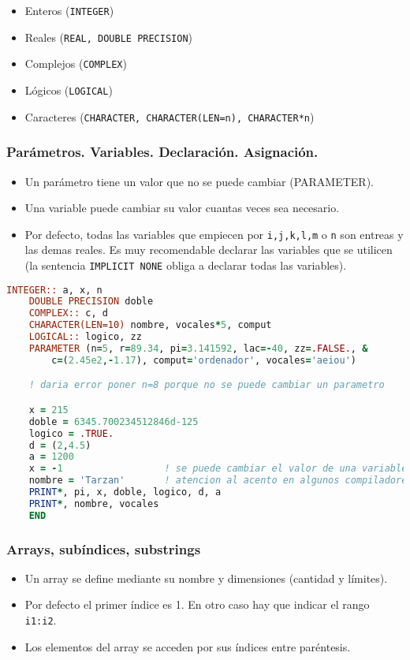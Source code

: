 \begin{itemize}
	\item Enteros ({\tt INTEGER})
	\item Reales ({\tt REAL, DOUBLE PRECISION})
	\item Complejos ({\tt COMPLEX})
	\item Lógicos ({\tt LOGICAL})
	\item Caracteres ({\tt CHARACTER, CHARACTER(LEN=n), CHARACTER*n})
\end{itemize}

\subsubsection{Parámetros. Variables. Declaración. Asignación.}

\begin{itemize}
	\item Un parámetro tiene un valor que no se puede cambiar (PARAMETER).
	\item Una variable puede cambiar su valor cuantas veces sea necesario.
	\item Por defecto, todas las variables que empiecen por \texttt{i,j,k,l,m} o \texttt{n} son entreas y las demas reales. Es muy recomendable declarar las variables que se utilicen (la sentencia {\tt IMPLICIT NONE} obliga a declarar todas las variables).
\end{itemize}

\begin{lstlisting}[language=Fortran]
	INTEGER:: a, x, n
	DOUBLE PRECISION doble
	COMPLEX:: c, d
	CHARACTER(LEN=10) nombre, vocales*5, comput
	LOGICAL:: logico, zz
	PARAMETER (n=5, r=89.34, pi=3.141592, lac=-40, zz=.FALSE., &
		c=(2.45e2,-1.17), comput='ordenador', vocales='aeiou')

	! daria error poner n=8 porque no se puede cambiar un parametro

	x = 215
	doble = 6345.700234512846d-125
	logico = .TRUE.
	d = (2,4.5)
	a = 1200
	x = -1  				! se puede cambiar el valor de una variable
	nombre = 'Tarzan' 		! atencion al acento en algunos compiladores
	PRINT*, pi, x, doble, logico, d, a
	PRINT*, nombre, vocales
	END
\end{lstlisting}

\subsubsection{Arrays, subíndices, substrings}

\begin{itemize}
	\item Un array se define mediante su nombre y dimensiones (cantidad y límites).
	\item Por defecto el primer índice es 1. En otro caso hay que indicar el rango {\tt i1:i2}.
	\item Los elementos del array se acceden por sus índices entre paréntesis.
\end{itemize}

